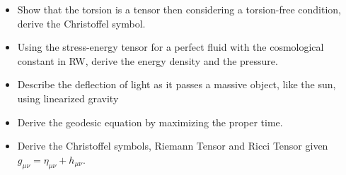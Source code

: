 \begin{itemize}
\item Show that the torsion is a tensor then considering a torsion-free condition, derive the Christoffel symbol.

\item Using the stress-energy tensor for a perfect fluid with the cosmological constant in RW, derive the energy density and the pressure.
\item Describe the deflection of light as it passes a massive object, like the sun, using linearized gravity
\item Derive the geodesic equation by maximizing the proper time.
\item Derive the Christoffel symbols, Riemann Tensor and Ricci Tensor given $g_{\mu \nu } = \eta_{\mu \nu } +h_{\mu \nu }$.
\end{itemize}












